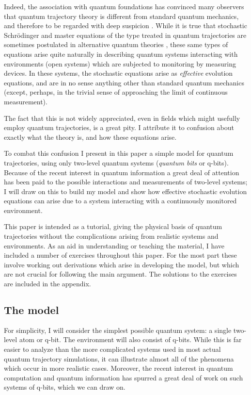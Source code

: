 Indeed, the association with quantum foundations has convinced many
observers that quantum trajectory theory is different from
standard quantum mechanics, and therefore to be regarded with deep
suspicion \cite{Zeh}.  While it is true that stochastic Schr\"odinger
and master equations of the type treated in quantum trajectories
are sometimes postulated in alternative quantum theories
\cite{Pearle,GRW,Percival2,Penrose},
these same types of equations arise quite naturally in describing
quantum systems interacting with environments (open systems)
which are subjected to monitoring by measuring devices.  In these
systems, the stochastic equations arise as {\it effective} evolution
equations, and are in no sense anything other than standard quantum
mechanics (except, perhaps, in the trivial sense of approaching the
limit of continuous measurement).

The fact that this is not widely appreciated, even in fields which might
usefully employ quantum trajectories, is a great pity.  I attribute it
to confusion about exactly what the theory is, and how these equations
arise.

To combat this confusion I present in this paper a simple model for
quantum trajectories, using only two-level quantum systems ({\it quantum bits}
or q-bits).  Because of the recent interest in quantum information
a great deal of attention has been paid to the possible interactions
and measurements of two-level systems; I will draw on this to build my
model and show how effective stochastic evolution equations can arise
due to a system interacting with a continuously monitored environment.

This paper is intended as a tutorial, giving the physical basis of
quantum trajectories without the complications arising from realistic
systems and environments.  As an aid in understanding or teaching the
material, I have included a number of exercises throughout this paper.
For the most part these involve working out derivations which arise in
developing the model, but which are not crucial for following the main
argument.  The solutions to the exercises are included in the appendix.

\subsection{The model}

For simplicity, I will consider the simplest possible quantum system:
a single two-level atom or q-bit.  The environment will also consist of 
q-bits.  While this is far easier to analyze
than the more complicated systems used in most actual quantum trajectory
simulations, it can illustrate almost all of the phenomena which occur
in more realistic cases.  Moreover, the recent interest in
quantum computation and quantum information has spurred a great deal of
work on such systems of q-bits, which we can draw on.

